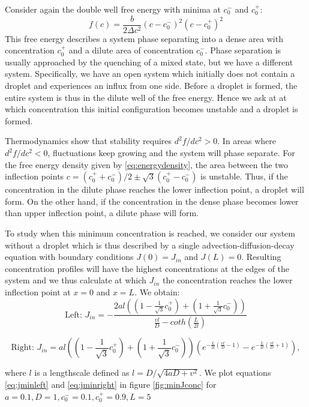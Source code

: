 \documentclass{Dissertate}
\begin{document}
Consider again the double well free energy with minima at \(c_0^-\) and
\(c_0^+\): \begin{equation}
f(c) = \frac{b}{2\Delta c^2}(c-c_0^-)^2(c-c_0^+)^2
\label{eq:energydensity}\end{equation} This free energy describes a
system phase separating into a dense area with concentration \(c_0^+\)
and a dilute area of concentration \(c_0^-\). Phase separation is usually approached by the quenching of a mixed state, but we have a different system. Specifically, we have an open system which initially does not contain a droplet and experiences an influx from one side. Before a droplet is formed, the entire system is thus in the dilute well of the free energy. Hence we ask at
 at which concentration this initial configuration becomes unstable and a droplet is formed.
 
Thermodynamics show that stability requires \(d^2f/dc^2>0\). In areas where \(d^2f/dc^2<0\), fluctuations keep growing and the system will phase separate. For the free energy density
given by \ref{eq:energydensity}, the area between the two inflection
points \(c=(c_0^++c_0^-)/2\pm\sqrt{3}(c_0^+-c_0^-)\) is unstable. Thus,
if the concentration in the dilute phase reaches the lower inflection point, a droplet will form. On the other hand, if the concentration in the dense phase becomes lower than upper inflection point, a dilute phase will form.  


To study when this minimum concentration is reached, we consider our
system without a droplet which is thus described by a single
advection-diffusion-decay equation with boundary conditions
\(J(0)=J_{in}\) and \(J(L)=0\). Resulting concentration profiles will
have the highest concentrations at the edges of the system and we thus calculate at
which \(J_{in}\) the concentration reaches the lower inflection point at $x=0$ and $x=L$.
We obtain: 
\begin{equation}
\text{Left:  }J_{in} = - \frac{ 2al((1-\frac{1}{\sqrt{3}}c_0^+)+(1+\frac{1}{\sqrt{3}}c_0^-))}{\frac{vl}{D}-coth(\frac{L}{2l})}
\label{eq:jminleft}
\end{equation}

\begin{equation}
\text{Right: } J_{in} =al((1-\frac{1}{\sqrt{3}}c_0^+)+(1+\frac{1}{\sqrt{3}}c_0^-))\left(e^{-\frac{L}{2l}(\frac{vl}{D}-1)}-e^{-\frac{L}{2l}(\frac{vl}{D}+1)}\right),
\label{eq:jminright}
\end{equation}

where \(l\) is a lengthscale defined as \(l=D/\sqrt{4aD+v^2}\). We plot equations \ref{eq:jminleft} and \ref{eq:jminright} in figure \ref{fig:minJconc} for \(a=0.1, D=1 ,c_0^-=0.1,c_0^+=0.9, L=5\)
\end{document}
